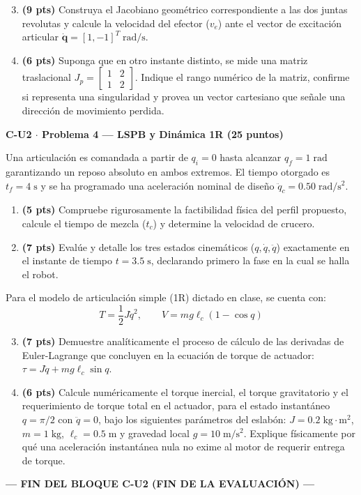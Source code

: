 \documentclass[11pt, a4paper]{article}
\begin{document}
\begin{enumerate}
    \setcounter{enumi}{2}
    \item \textbf{(9 pts)} Construya el Jacobiano geométrico correspondiente a las dos juntas revolutas y calcule la velocidad del efector ($v_e$) ante el vector de excitación articular $\dot{\mathbf{q}} = [1, -1]^T\;\mathrm{rad/s}$.
    \item \textbf{(6 pts)} Suponga que en otro instante distinto, se mide una matriz traslacional $J_p = \begin{bmatrix} 1 & 2 \\ 1 & 2 \end{bmatrix}$. Indique el rango numérico de la matriz, confirme si representa una singularidad y provea un vector cartesiano que señale una dirección de movimiento perdida.
\end{enumerate}

\vspace{0.4cm}
\noindent\textbf{\large C-U2 $\cdot$ Problema 4 — LSPB y Dinámica 1R (25 puntos)}

Una articulación es comandada a partir de $q_i = 0$ hasta alcanzar $q_f = 1\;\mathrm{rad}$ garantizando un reposo absoluto en ambos extremos. El tiempo otorgado es $t_f = 4\;\mathrm{s}$ y se ha programado una aceleración nominal de diseño $\ddot{q}_c = 0.50\;\mathrm{rad/s^2}$.

\begin{enumerate}
    \item \textbf{(5 pts)} Compruebe rigurosamente la factibilidad física del perfil propuesto, calcule el tiempo de mezcla ($t_c$) y determine la velocidad de crucero.
    \item \textbf{(7 pts)} Evalúe y detalle los tres estados cinemáticos ($q, \dot{q}, \ddot{q}$) exactamente en el instante de tiempo $t = 3.5\;\mathrm{s}$, declarando primero la fase en la cual se halla el robot.
\end{enumerate}

Para el modelo de articulación simple (1R) dictado en clase, se cuenta con:
\begin{equation*}
    T = \frac{1}{2}J\dot{q}^2, \qquad V = mg\ell_c(1 - \cos q)
\end{equation*}

\begin{enumerate}
    \setcounter{enumi}{2}
    \item \textbf{(7 pts)} Demuestre analíticamente el proceso de cálculo de las derivadas de Euler-Lagrange que concluyen en la ecuación de torque de actuador: $\tau = J\ddot{q} + mg\ell_c\sin q$.
    \item \textbf{(6 pts)} Calcule numéricamente el torque inercial, el torque gravitatorio y el requerimiento de torque total en el actuador, para el estado instantáneo $q = \pi/2$ con $\ddot{q} = 0$, bajo los siguientes parámetros del eslabón: $J = 0.2\;\mathrm{kg\cdot m^2}$, $m = 1\;\mathrm{kg}$, $\ell_c = 0.5\;\mathrm{m}$ y gravedad local $g = 10\;\mathrm{m/s^2}$. Explique físicamente por qué una aceleración instantánea nula no exime al motor de requerir entrega de torque.
\end{enumerate}

\begin{center}
    \textbf{--- FIN DEL BLOQUE C-U2 (FIN DE LA EVALUACIÓN) ---}
\end{center}
\end{document}
